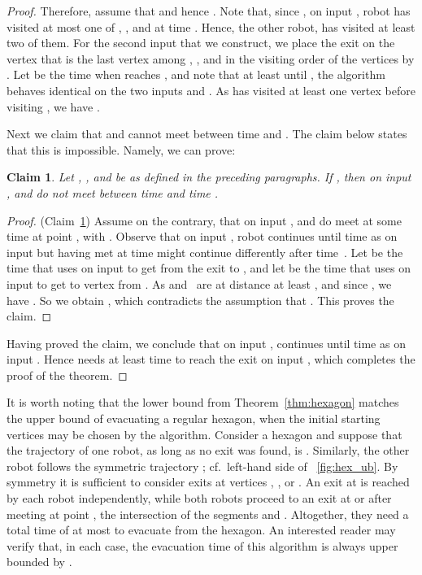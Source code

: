 \documentclass[
final
]{dmtcs-episciences}
\newtheorem{claim}[theorem]{Claim}
\theoremstyle{definition}
\begin{document}
\begin{proof}
Therefore, assume that  and hence 	.
Note that, since , on input , robot
 has visited at most one of , , and  at time . 
Hence, the other robot,  has visited at least two of them.
For the second input  that we construct, we place the exit on the vertex  that is the last vertex among , , and  in the visiting order of the vertices by .
Let  be the time when  reaches , and note that at least until , the algorithm  behaves identical on the two inputs  and .
As  has visited at least one vertex before visiting , we have .

Next we claim that  and  cannot meet between time  and .
The claim below states that this is impossible. Namely, we can prove:
\begin{claim}\label{claim:hex}
Let , , and  be as defined in the preceding paragraphs. 
If , then on input ,  and  do not meet between time  and time .
\end{claim}
\begin{proof} (Claim~\ref{claim:hex})
Assume on the contrary, that
on input ,  and  do meet at some time  at point , with
.
Observe that on input , robot  continues until time  as on input  but having met  at time  might continue differently after time~.
Let  be the time that  uses on input  to get from the exit  to ,  
and let  be the time that  uses on input  to get to vertex  from .  As  and~ are at distance at least , and since , we have
.  So we obtain , which contradicts the assumption that .
This proves the claim. 
\end{proof}


Having proved the claim, we conclude that on input , 
 continues until time  as on input . Hence  needs at least  time to reach the exit on input ,
which completes the proof of the theorem.
\end{proof}

It is worth noting that the lower bound from Theorem~\ref{thm:hexagon} matches the upper bound of evacuating a regular hexagon, when the initial starting vertices may be chosen by the algorithm. 
Consider a hexagon  and suppose that the trajectory of one robot, as long as no exit was found, is . 
Similarly, the other robot follows the symmetric trajectory ; cf.\ left-hand side of \figurename~\ref{fig:hex_ub}. 
By symmetry it is sufficient to consider exits at vertices , , or . 
An exit at  is reached by each robot independently, while both robots proceed to an exit at  or  after meeting at point , the intersection of the segments  and . 
Altogether, they need a total time of at most  to evacuate from the hexagon. 
An interested reader may verify that, in each case, the evacuation time of this algorithm is always upper bounded by .
\end{document}
